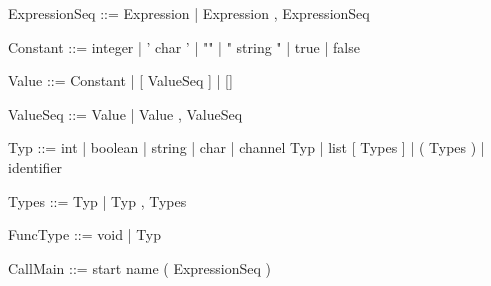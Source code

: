 \documentclass[11pt]{report}
\begin{document}
\begin{verbnobox}[\normalfont]
ExpressionSeq ::= Expression | Expression , ExpressionSeq
\end{verbnobox}
\vspace*{3pt}

\begin{verbnobox}[\normalfont]
Constant ::= integer
             | ' char '
             | ""
             | " string "
             | true
             | false
\end{verbnobox}
\vspace*{3pt}

\begin{verbnobox}[\normalfont]
Value ::= Constant | [ ValueSeq ] | []
\end{verbnobox}
\vspace*{3pt}

\begin{verbnobox}[\normalfont]
ValueSeq ::= Value | Value , ValueSeq
\end{verbnobox}
\vspace*{3pt}

\begin{verbnobox}[\normalfont]
Typ ::= int
      | boolean
      | string
      | char
      | channel Typ
      | list [ Types ]
      | ( Types )
      | identifier
\end{verbnobox}
\vspace*{3pt}

\begin{verbnobox}[\normalfont]
Types ::= Typ | Typ , Types
\end{verbnobox}
\vspace*{3pt}

\begin{verbnobox}[\normalfont]
FuncType ::= void | Typ
\end{verbnobox}
\vspace*{3pt}

\begin{verbnobox}[\normalfont]
CallMain ::= start name ( ExpressionSeq )
\end{verbnobox}
\vspace*{3pt}
\end{document}
